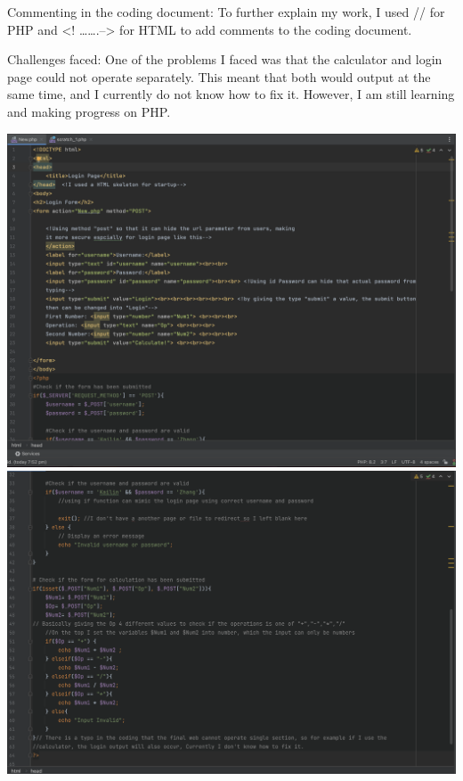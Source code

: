 \documentclass[a4paper, 11pt]{report}
\begin{document}
Commenting in the coding document:
To further explain my work, I used // for PHP and <! …….--> for HTML to add comments to the coding document.

Challenges faced:
One of the problems I faced was that the calculator and login page could not operate separately. This meant that both would output at the same time, and I currently do not know how to fix it. However, I am still learning and making progress on PHP.

\includegraphics[width=1\textwidth]{1}
\includegraphics[width=1\textwidth]{2}

\newpage



\end{document}
